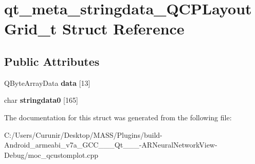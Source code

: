 \hypertarget{structqt__meta__stringdata___q_c_p_layout_grid__t}{}\section{qt\+\_\+meta\+\_\+stringdata\+\_\+\+Q\+C\+P\+Layout\+Grid\+\_\+t Struct Reference}
\label{structqt__meta__stringdata___q_c_p_layout_grid__t}
\subsection*{Public Attributes}
\begin{DoxyCompactItemize}
\item 
\mbox{\label{structqt__meta__stringdata___q_c_p_layout_grid__t_aa1db26a82b139a91d5454286b0ab2086}} 
Q\+Byte\+Array\+Data {\bfseries data} \mbox{[}13\mbox{]}
\item 
\mbox{\label{structqt__meta__stringdata___q_c_p_layout_grid__t_a706fba9f362d9a7abc676fd7310b5e13}} 
char {\bfseries stringdata0} \mbox{[}165\mbox{]}
\end{DoxyCompactItemize}


The documentation for this struct was generated from the following file\+:\begin{DoxyCompactItemize}
\item 
C\+:/\+Users/\+Curunir/\+Desktop/\+M\+A\+S\+S/\+Plugins/build-\/\+Android\+\_\+armeabi\+\_\+v7a\+\_\+\+G\+C\+C\+\_\+\_\+\_\+\+Qt\+\_\+\_\+\_-\/\+A\+R\+Neural\+Network\+View-\/\+Debug/moc\+\_\+qcustomplot.\+cpp\end{DoxyCompactItemize}
